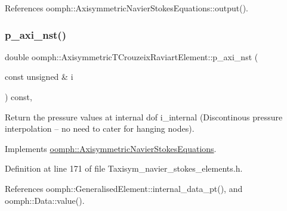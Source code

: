 References oomph\+::\+Axisymmetric\+Navier\+Stokes\+Equations\+::output().

\mbox{\label{classoomph_1_1AxisymmetricTCrouzeixRaviartElement_a50bbe7b609760f1e41ef35756ef70b31}} 
\subsubsection{\texorpdfstring{p\+\_\+axi\+\_\+nst()}{p\_axi\_nst()}}
{\footnotesize\ttfamily double oomph\+::\+Axisymmetric\+T\+Crouzeix\+Raviart\+Element\+::p\+\_\+axi\+\_\+nst (\begin{DoxyParamCaption}\item[{const unsigned \&}]{i }\end{DoxyParamCaption}) const\hspace{0.3cm}{\ttfamily [inline]}, {\ttfamily [virtual]}}



Return the pressure values at internal dof i\+\_\+internal (Discontinous pressure interpolation -- no need to cater for hanging nodes). 



Implements \hyperlink{classoomph_1_1AxisymmetricNavierStokesEquations_a3aa173227f477a40fb4adba84a337f5b}{oomph\+::\+Axisymmetric\+Navier\+Stokes\+Equations}.



Definition at line 171 of file Taxisym\+\_\+navier\+\_\+stokes\+\_\+elements.\+h.



References oomph\+::\+Generalised\+Element\+::internal\+\_\+data\+\_\+pt(), and oomph\+::\+Data\+::value().

\mbox{\label{classoomph_1_1AxisymmetricTCrouzeixRaviartElement_af9acbebdb665021f80bf849904f52c7c}} 

